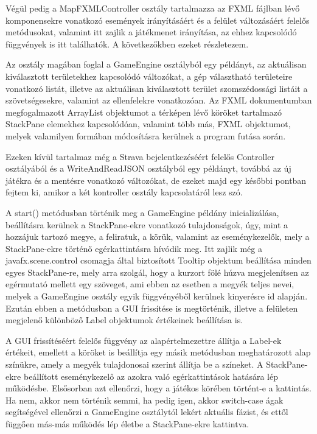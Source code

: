 Végül pedig a MapFXMLController osztály tartalmazza az FXML fájlban lévő komponensekre vonatkozó események irányításáért és a felület változásáért felelős metódusokat, valamint itt zajlik a játékmenet irányítása, az ehhez kapcsolódó függvények is itt találhatók. A következőkben ezeket részletezem. 

Az osztály magában foglal a GameEngine osztályból egy példányt, az aktuálisan kiválasztott területekhez kapcsolódó változókat, a gép választható területeire vonatkozó listát, illetve az aktuálisan kiválasztott terület szomszédossági listáit a szövetségesekre, valamint az ellenfelekre vonatkozóan. Az FXML dokumentumban megfogalmazott ArrayList objektumot a térképen lévő köröket tartalmazó StackPane elemekhez kapcsolódóan, valamint több más, FXML objektumot, melyek valamilyen formában módosításra kerülnek a program futása során. 

Ezeken kívül tartalmaz még a Strava bejelentkezéséért felelős Controller osztályából és a WriteAndReadJSON osztályból egy példányt, továbbá az új játékra és a mentésre vonatkozó változókat, de ezeket majd egy későbbi pontban fejtem ki, amikor a két kontroller osztály kapcsolatáról lesz szó. 

A start() metódusban történik meg a GameEngine példány inicializálása, beállításra kerülnek a StackPane-ekre vonatkozó tulajdonságok, úgy, mint a hozzájuk tartozó megye, a feliratuk, a körük, valamint az eseménykezelők, mely a StackPane-ekre történő egérkattintásra hívódik meg. Itt zajlik még a javafx.scene.control csomagja által biztosított Tooltip objektum beállítása minden egyes StackPane-re, mely arra szolgál, hogy a kurzort fölé húzva megjelenítsen az egérmutató mellett egy szöveget, ami ebben az esetben a megyék teljes nevei, melyek a GameEngine osztály egyik függvényéből kerülnek kinyerésre id alapján. Ezután ebben a metódusban a GUI frissítése is megtörténik, illetve a felületen megjelenő különböző Label objektumok értékeinek beállítása is. 

A GUI frissítéséért felelős függvény az alapértelmezettre állítja a Label-ek értékeit, emellett a köröket is beállítja egy másik metódusban meghatározott alap színükre, amely a megyék tulajdonosai szerint állítja be a színeket. A StackPane-ekre beállított eseménykezelő az azokra való egérkattintások hatására lép működésbe. Elsősorban azt ellenőrzi, hogy a játékos körében történt-e a kattintás. Ha nem, akkor nem történik semmi, ha pedig igen, akkor switch-case ágak segítségével ellenőrzi a GameEngine osztálytól lekért aktuális fázist, és ettől függően más-más működés lép életbe a StackPane-ekre kattintva. 

